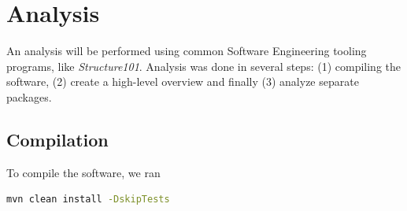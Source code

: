 \documentclass{article}
\begin{document}


\section{Analysis}
An analysis will be performed using common Software Engineering tooling programs, like \textit{Structure101}. Analysis was done in several steps: (1) compiling the software, (2) create a high-level overview and finally (3) analyze separate packages.

\subsection{Compilation}
To compile the software, we ran 

\begin{lstlisting}[language=bash]
mvn clean install -DskipTests
\end{lstlisting}
\end{document}
